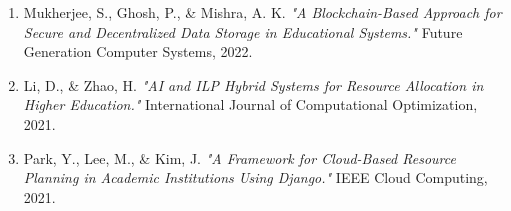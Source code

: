 \documentclass[a4paper, 12pt]{report}
\begin{document}
\begin{enumerate}
    \item Mukherjee, S., Ghosh, P., \& Mishra, A. K. \textit{"A Blockchain-Based Approach for Secure and Decentralized Data Storage in Educational Systems."} Future Generation Computer Systems, 2022.
    
    \item Li, D., \& Zhao, H. \textit{"AI and ILP Hybrid Systems for Resource Allocation in Higher Education."} International Journal of Computational Optimization, 2021.
    
    \item Park, Y., Lee, M., \& Kim, J. \textit{"A Framework for Cloud-Based Resource Planning in Academic Institutions Using Django."} IEEE Cloud Computing, 2021.
    
  

\end{enumerate}





\end{document}
